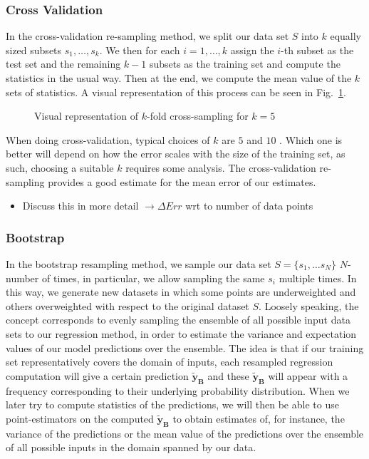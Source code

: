 \documentclass[reprint, english, nofootinbib]{revtex4-2}
\begin{document}
        \subsubsection{Cross Validation}
            \noindent
            In the cross-validation re-sampling method, we split our data set $S$ into $k$ equally sized subsets $s_1, \dots, s_k$.
            We then for each $i = 1,\dots, k$ assign the $i$-th subset as the test set and the remaining $k-1$ subsets as the training set and compute the statistics in the usual way. Then at the end, we compute the mean value of the $k$ sets of statistics. A visual representation of this process can be seen in Fig.~\ref{fig: Cross Validation}.
            \begin{figure}[h!tb]
                \center
                \vspace{5mm} %
                
                \caption{\label{fig: Cross Validation}Visual representation of $k$-fold cross-sampling for $k=5$}
            \end{figure}
            When doing cross-validation, typical choices of $k$ are $5$ and $10$ \cite{hastie}. Which one is better will depend on how the error scales with the size of the training set, as such, choosing a suitable $k$ requires some analysis.
            The cross-validation re-sampling provides a good estimate for the mean error of our estimates.
            \begin{itemize}
                \item Discuss this in more detail $\rightarrow\Delta Err$ wrt to number of data points
            \end{itemize}
        \subsubsection{Bootstrap}
            \noindent
            In the bootstrap resampling method, we sample our data set $S = \{s_1, \dots s_N\}$ $N$-number of times, in particular, we allow sampling the same $s_i$ multiple times. In this way, we generate new datasets in which some points are underweighted and others overweighted with respect to the original dataset $S$. Loosely speaking, the concept corresponds to evenly sampling the ensemble of all possible input data sets to our regression method, in order to estimate the variance and expectation values of our model predictions over the ensemble. The idea is that if our training set representatively covers the domain of inputs, each resampled regression computation will give a certain prediction $\pmb{\tilde{y}_{B}}$ and these $\pmb{\tilde{y}_{B}}$ will appear with a frequency corresponding to their  underlying probability distribution. When we later try to compute statistics of the predictions, we will then be able to use point-estimators on the computed $\pmb{\tilde{y}_{B}}$ to obtain estimates of, for instance, the variance of the predictions or the mean value of the predictions over the ensemble of all possible inputs in the domain spanned by our data.
\end{document}
